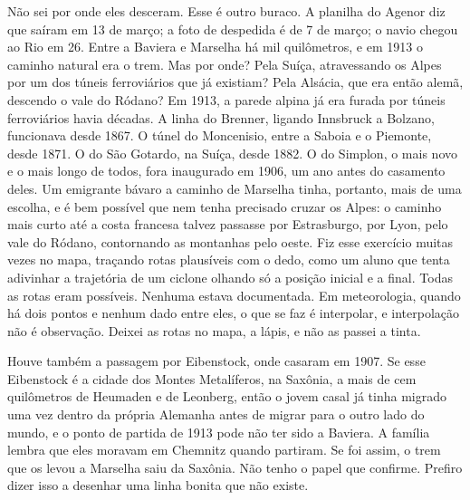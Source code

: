 \documentclass[
  brazilian,
  11pt,
  openany]{book}
\begin{document}
Não sei por onde eles desceram. Esse é outro buraco. A planilha do
Agenor diz que saíram em 13 de março; a foto de despedida é de 7 de
março; o navio chegou ao Rio em 26. Entre a Baviera e Marselha há mil
quilômetros, e em 1913 o caminho natural era o trem. Mas por onde? Pela
Suíça, atravessando os Alpes por um dos túneis ferroviários que já
existiam? Pela Alsácia, que era então alemã, descendo o vale do Ródano?
Em 1913, a parede alpina já era furada por túneis ferroviários havia
décadas. A linha do Brenner, ligando Innsbruck a Bolzano, funcionava
desde 1867. O túnel do Moncenisio, entre a Saboia e o Piemonte, desde
1871. O do São Gotardo, na Suíça, desde 1882. O do Simplon, o mais novo
e o mais longo de todos, fora inaugurado em 1906, um ano antes do
casamento deles. Um emigrante bávaro a caminho de Marselha tinha,
portanto, mais de uma escolha, e é bem possível que nem tenha precisado
cruzar os Alpes: o caminho mais curto até a costa francesa talvez
passasse por Estrasburgo, por Lyon, pelo vale do Ródano, contornando as
montanhas pelo oeste. Fiz esse exercício muitas vezes no mapa, traçando
rotas plausíveis com o dedo, como um aluno que tenta adivinhar a
trajetória de um ciclone olhando só a posição inicial e a final. Todas
as rotas eram possíveis. Nenhuma estava documentada. Em meteorologia,
quando há dois pontos e nenhum dado entre eles, o que se faz é
interpolar, e interpolação não é observação. Deixei as rotas no mapa, a
lápis, e não as passei a tinta.

Houve também a passagem por Eibenstock, onde casaram em 1907. Se esse
Eibenstock é a cidade dos Montes Metalíferos, na Saxônia, a mais de cem
quilômetros de Heumaden e de Leonberg, então o jovem casal já tinha
migrado uma vez dentro da própria Alemanha antes de migrar para o outro
lado do mundo, e o ponto de partida de 1913 pode não ter sido a Baviera.
A família lembra que eles moravam em Chemnitz quando partiram. Se foi
assim, o trem que os levou a Marselha saiu da Saxônia. Não tenho o papel
que confirme. Prefiro dizer isso a desenhar uma linha bonita que não
existe.
\end{document}
